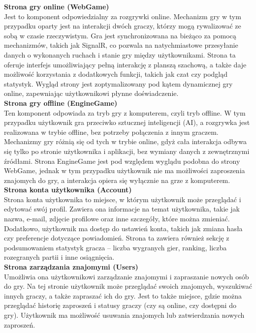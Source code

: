 \documentclass[12pt,a4paper]{article}
\begin{document}
\noindent \textbf{Strona gry online (WebGame)}\\
Jest to komponent odpowiedzialny za rozgrywki online. Mechanizm gry w tym przypadku oparty jest na interakcji dwóch graczy, którzy mogą rywalizować ze sobą w czasie rzeczywistym. Gra jest synchronizowana na bieżąco za pomocą mechanizmów, takich jak SignalR, co pozwala na natychmiastowe przesyłanie danych o wykonanych ruchach i stanie gry między użytkownikami. Strona ta oferuje interfejs umożliwiający pełną interakcję z planszą szachową, a także daje możliwość korzystania z dodatkowych funkcji, takich jak czat czy podgląd statystyk. Wygląd strony jest zoptymalizowany pod kątem dynamicznej gry online, zapewniając użytkownikowi płynne doświadczenie.
\\

\noindent \textbf{Strona gry offline (EngineGame)}\\
Ten komponent odpowiada za tryb gry z komputerem, czyli tryb offline. W tym przypadku użytkownik gra przeciwko sztucznej inteligencji (AI), a rozgrywka jest realizowana w trybie offline, bez potrzeby połączenia z innym graczem. Mechanizmy gry różnią się od tych w trybie online, gdyż cała interakcja odbywa się tylko po stronie użytkownika i aplikacji, bez wymiany danych z zewnętrznymi źródłami. Strona EngineGame jest pod względem wyglądu podobna do strony WebGame, jednak w tym przypadku użytkownik nie ma możliwości zaproszenia znajomych do gry, a interakcja opiera się wyłącznie na grze z komputerem.
\\

\noindent \textbf{Strona konta użytkownika (Account)}\\
Strona konta użytkownika to miejsce, w którym użytkownik może przeglądać i edytować swój profil. Zawiera ona informacje na temat użytkownika, takie jak nazwa, e-mail, zdjęcie profilowe oraz inne szczegóły, które można zmieniać. Dodatkowo, użytkownik ma dostęp do ustawień konta, takich jak zmiana hasła czy preferencje dotyczące powiadomień. Strona ta zawiera również sekcję z podsumowaniem statystyk gracza – liczba wygranych gier, ranking, liczba rozegranych partii i inne osiągnięcia.
\\

\noindent \textbf{Strona zarządzania znajomymi (Users)}\\
Umożliwia ona użytkownikowi zarządzanie znajomymi i zapraszanie nowych osób do gry. Na tej stronie użytkownik może przeglądać swoich znajomych, wyszukiwać innych graczy, a także zapraszać ich do gry. Jest to także miejsce, gdzie można przeglądać historię zaproszeń i statusy graczy (czy są online, czy dostępni do gry). Użytkownik ma możliwość usuwania znajomych lub zatwierdzania nowych zaproszeń.
\\
\end{document}
